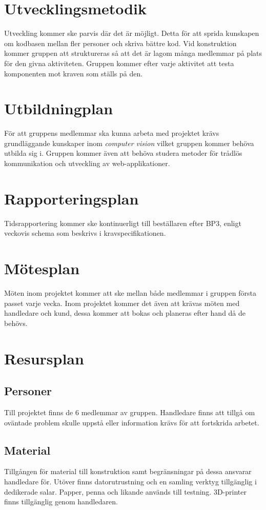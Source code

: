\documentclass[10pt,oneside,swedish]{lips}
\begin{document}
\section{Utvecklingsmetodik}
Utveckling kommer ske parvis där det är möjligt. Detta för att sprida kunskapen om kodbasen mellan fler personer och skriva bättre kod. Vid konstruktion kommer gruppen att struktureras så att det är lagom många medlemmar på plats för den givna aktiviteten. Gruppen kommer efter varje aktivitet att testa komponenten mot kraven som ställs på den.

\section{Utbildningplan}
För att gruppens medlemmar ska kunna arbeta med projektet krävs grundläggande kunskaper inom \textit{computer vision} vilket gruppen kommer behöva utbilda sig i. Gruppen kommer även att behöva studera metoder för trådlös kommunikation och utveckling av web-applikationer.

\section{Rapporteringsplan}
Tidsrapportering kommer ske kontinuerligt till beställaren efter BP3, enligt veckovis schema som beskrivs i kravspecifikationen\cite{kravspec}.  

\section{Mötesplan}
Möten inom projektet kommer att ske mellan både medlemmar i gruppen första passet varje vecka. Inom projektet kommer det även att krävas möten med handledare och kund, dessa kommer att bokas och planeras efter hand då de behövs.

\section{Resursplan}


\subsection{Personer}
Till projektet finns de 6 medlemmar av gruppen. Handledare finns att tillgå om oväntade problem skulle uppstå eller information krävs för att fortskrida arbetet.

\subsection{Material}
Tillgången för material till konstruktion samt begränsningar på dessa ansvarar handledare för. Utöver finns datorutrustning och en samling verktyg tillgänglig i dedikerade salar. Papper, penna och likande används till testning. 3D-printer finns tillgänglig genom handledaren.
\end{document}

